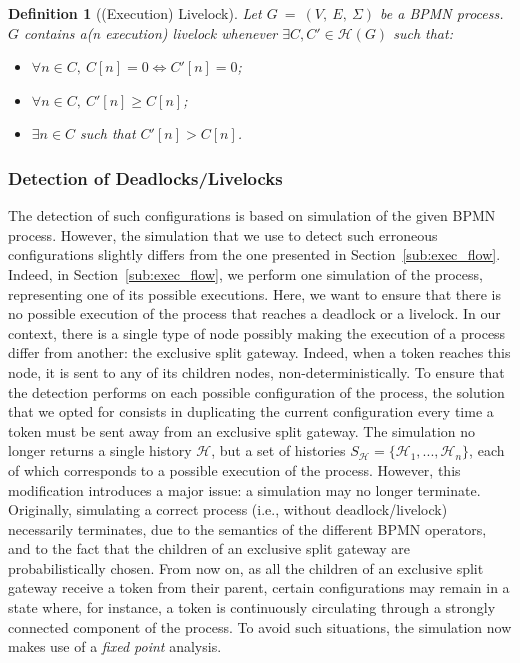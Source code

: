\documentclass{article}
\newcommand{\confset}[1]{\history(#1)}
\newcommand{\graph}{G~=~(V,~E,~\Sigma)}
\newcommand{\history}{\ensuremath{\mathcal{H}}}
\newtheorem{definition}{Definition}
\begin{document}
	\begin{definition}[(Execution) Livelock]
		Let $\graph$ be a BPMN process.
		$G$ contains \textnormal{a(n execution) livelock} whenever $\exists C, C' \in \confset{G}$ such that:
		
		\begin{itemize}
			\setlength\itemsep{-0.6em}
			\item[---] $\forall n \in C,\ C[n] = 0 \Leftrightarrow C'[n] = 0$;
			\item[---] $\forall n \in C,\ C'[n] \geq C[n]$;
			\item[---] $\exists n \in C$ such that $C'[n] > C[n]$.
		\end{itemize}
	\end{definition}
	
	\subsubsection{Detection of Deadlocks/Livelocks}
	
	The detection of such configurations is based on simulation of the given BPMN process.
	However, the simulation that we use to detect such erroneous configurations slightly differs from the one presented in Section~\ref{sub:exec_flow}.
	Indeed, in Section~\ref{sub:exec_flow}, we perform one simulation of the process, representing one of its possible executions.
	Here, we want to ensure that there is no possible execution of the process that reaches a deadlock or a livelock.
	In our context, there is a single type of node possibly making the execution of a process differ from another: the exclusive split gateway.
	Indeed, when a token reaches this node, it is sent to any of its children nodes, non-deterministically.
	To ensure that the detection performs on each possible configuration of the process, the solution that we opted for consists in duplicating the current configuration every time a token must be sent away from an exclusive split gateway.
	The simulation no longer returns a single history \history, but a set of histories $S_{\history} = \{\history_1, ..., \history_n\}$, each of which corresponds to a possible execution of the process.
	However, this modification introduces a major issue: a simulation may no longer terminate.
	Originally, simulating a correct process (i.e., without deadlock/livelock) necessarily terminates, due to the semantics of the different BPMN operators, and to the fact that the children of an exclusive split gateway are probabilistically chosen.
	From now on, as all the children of an exclusive split gateway receive a token from their parent, certain configurations may remain in a state where, for instance, a token is continuously circulating through a strongly connected component of the process.
	To avoid such situations, the simulation now makes use of a \textit{fixed point} analysis.
	
\end{document}
